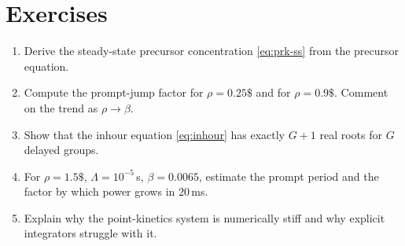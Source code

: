 \section*{Exercises}
\begin{enumerate}[leftmargin=*,itemsep=2pt]
\item Derive the steady-state precursor concentration \eqref{eq:prk-ss} from the precursor equation.
\item Compute the prompt-jump factor for $\rho=0.25\$$ and for $\rho=0.9\$$. Comment on the trend as $\rho\to\beta$.
\item Show that the inhour equation \eqref{eq:inhour} has exactly $G+1$ real roots for $G$ delayed groups.
\item For $\rho=1.5\$$, $\Lambda=10^{-5}\,$s, $\beta=0.0065$, estimate the prompt period and the factor by which power grows in $20\,$ms.
\item Explain why the point-kinetics system is numerically stiff and why explicit integrators struggle with it.
\end{enumerate}
